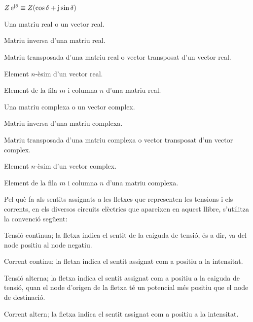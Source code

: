 \begin{list}{}
     $Z\,\eu^{\ju\delta} \equiv Z(\cos\delta+\ju\sin\delta)$
    \item[$\boldsymbol{V}$] Una matriu real o un vector real.
    \item[$\boldsymbol{V}^{-1}$] Matriu inversa d'una matriu real.
    \item[$\transp{\boldsymbol{V}}$] Matriu transposada d'una matriu real o vector
    transposat d'un vector real.
    \item[$\boldsymbol{V}(n)$] Element $n$-\`{e}sim d'un vector real.
    \item[$\boldsymbol{V}(m,n)$] Element de la fila $m$ i columna $n$ d'una matriu real.
    \item[$\mcmplx{V}$] Una matriu complexa o un vector complex.
    \item[$\mcmplx{V}^{-1}$] Matriu inversa d'una matriu complexa.
    \item[\transp{$\mcmplx{V}}$] Matriu transposada d'una matriu complexa o vector
    transposat d'un vector complex.
    \item[$\mcmplx{V}(n)$] Element $n$-\`{e}sim d'un vector complex.
    \item[$\mcmplx{V}(m,n)$] Element de la fila $m$ i columna $n$ d'una matriu complexa.
\end{list}

Pel qu\`{e} fa als sentits assignats a les fletxes que representen les
tensions i els corrents, en els diversos circuits el\`{e}ctrics que
apareixen en aquest llibre, s'utilitza la convenci\'{o} seg\"{u}ent:

\begin{list}{}
{\setlength{\labelwidth}{15mm} \setlength{\leftmargin}{25mm}
\setlength{\labelsep}{10mm}}
    \item[$\begin{CD} @>U>> \end{CD}$] Tensi\'{o} cont\'{\i}nua; la fletxa indica el sentit
    de la caiguda de tensi\'{o}, \'{e}s a dir, va del node positiu al node negatiu.
    \item[$\begin{CD} @>I>> \end{CD}$] Corrent
    continu; la fletxa indica el sentit  assignat com a positiu a la
    intensitat.
    \item[$\begin{CD} @>\cmplx{U}>> \end{CD}$] Tensi\'{o} alterna; la fletxa indica el
    sentit assignat com a positiu a la caiguda de tensi\'{o}, quan el node d'origen de la fletxa
    t\'{e} un potencial  m\'{e}s positiu que el node de destinaci\'{o}.
    \item[$\begin{CD} @>\cmplx{I}>> \end{CD}$] Corrent altern; la fletxa
    indica el sentit  assignat com a positiu a la
    intensitat.
\end{list}
